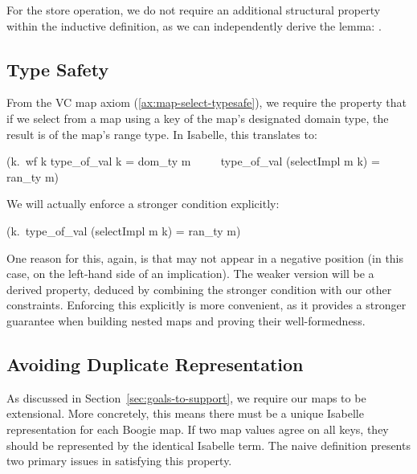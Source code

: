 For the store operation, we do not require an additional structural property within the inductive definition, as we can independently derive the lemma:
.


\subsection{Type Safety}
\label{sec:type-safety}
From the VC map axiom (\ref{ax:map-select-typesafe}),
we require the property that if we select from a map using a key of the map's designated domain type,
the result is of the map's range type.
In Isabelle, this translates to:

\begin{isabellebody}\isanewline
({\isasymforall}k.\ wf k {\isasymand} type\_of\_val k = dom\_ty m\isanewline
\ \ \ \ {\isasymlongrightarrow} type\_of\_val (selectImpl m k) = ran\_ty m)
\end{isabellebody}


We will actually enforce a stronger condition explicitly:

\begin{isabellebody}\isanewline
({\isasymforall}k.\ type\_of\_val (selectImpl m k) = ran\_ty m)
\end{isabellebody}


One reason for this, again, is that  may not appear in a negative position
(in this case, on the left-hand side of an implication).
The weaker version will be a derived property, deduced by combining the stronger condition with our other constraints.
Enforcing this explicitly is more convenient, as it provides a stronger guarantee when building nested maps and proving their well-formedness.


\subsection{Avoiding Duplicate Representation}
\label{sec:no-duplicate}

As discussed in Section~\ref{sec:goals-to-support}, we require our maps to be extensional.
More concretely, this means there must be a unique Isabelle representation for each Boogie map.
If two map values agree on all keys, they should be represented by the identical Isabelle term.
The naive definition presents two primary issues in satisfying this property.

